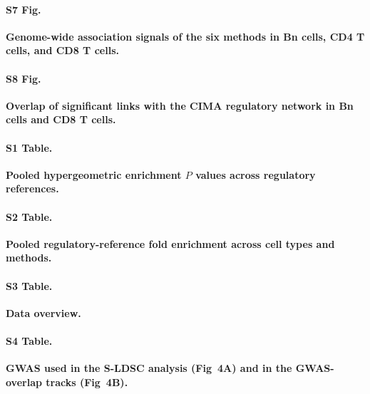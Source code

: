 \paragraph*{S7 Fig.}
\label{S7_Fig}
\textbf{Genome-wide association signals of the six methods in Bn cells, CD4 T cells, and CD8 T cells.}

\paragraph*{S8 Fig.}
\label{S8_Fig}
\textbf{Overlap of significant links with the CIMA regulatory network in Bn cells and CD8 T cells.}

\paragraph*{S1 Table.}
\label{S1_Table}
\textbf{Pooled hypergeometric enrichment $P$ values across regulatory references.}

\paragraph*{S2 Table.}
\label{S2_Table}
\textbf{Pooled regulatory-reference fold enrichment across cell types and methods.}

\paragraph*{S3 Table.}
\label{S3_Table}
\textbf{Data overview.}

\paragraph*{S4 Table.}
\label{S4_Table}
\textbf{GWAS used in the S-LDSC analysis (Fig~4A) and in the GWAS-overlap tracks (Fig~4B).}
